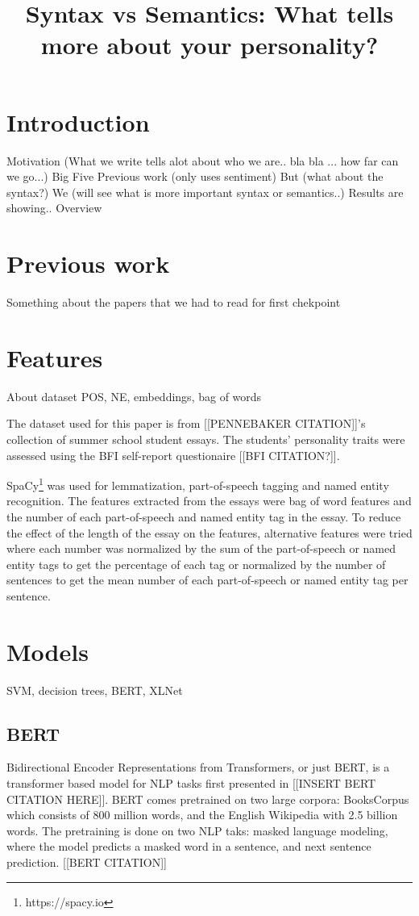 \documentclass[10pt, a4paper]{article}
\title{Syntax vs Semantics: What tells more about your personality?}
\begin{document}
\maketitleabstract

\section{Introduction}
Motivation (What we write tells alot about who we are.. bla bla ... how far can we go...)
Big Five
Previous work (only uses sentiment)
But (what about the syntax?)
We (will see what is more important syntax or semantics..)
Results are showing..
Overview

\section{Previous work}
Something about the papers that we had to read for first chekpoint

\section{Features}
About dataset
POS, NE, embeddings, bag of words

The dataset used for this paper is from [[PENNEBAKER CITATION]]'s \cite{pennebaker} collection of summer school student essays. The students' personality traits were assessed using the BFI self-report questionaire [[BFI CITATION?]].

SpaCy\footnote{https://spacy.io} was used for lemmatization, part-of-speech tagging and named entity recognition.
The features extracted from the essays were bag of word features and the number of each part-of-speech and named entity tag in the essay.
To reduce the effect of the length of the essay on the features, alternative features were tried where each number was normalized by the sum of the part-of-speech or named entity tags to get the percentage of each tag or normalized by the number of sentences to get the mean number of each part-of-speech or named entity tag per sentence.

\section{Models}
SVM, decision trees, BERT, XLNet

\subsection{BERT}

Bidirectional Encoder Representations from Transformers, or just BERT, is a transformer based model for NLP tasks first presented in [[INSERT BERT CITATION HERE]]. BERT comes pretrained on two large corpora: BooksCorpus which consists of 800 million words, and the English Wikipedia with 2.5 billion words. The pretraining is done on two NLP taks: masked language modeling, where the model predicts a masked word in a sentence, and next sentence prediction. [[BERT CITATION]]
\end{document}
